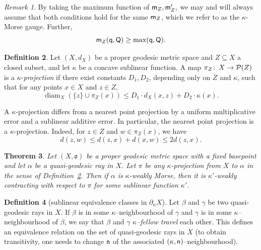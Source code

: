 \documentclass[12 pt]{amsart}
\newcommand{\gothic}{\mathfrak}
\newcommand{\go}{{\gothic o}}
\newtheorem{theorem}{Theorem}[section]
\theoremstyle{definition}
\newtheorem{definition}[theorem]{Definition}
\theoremstyle{remark}
\newtheorem{remark}[theorem]{Remark}
\newcommand{\pka}{\partial_{\kappa}}
\newcommand{\sQ}{{\sf Q}}
\newcommand{\mm}{{\sf m}}
\newcommand{\nn}{{\sf n}}
\newcommand{\qq}{{\sf q}}
\DeclareMathOperator{\diam}{diam}
\newcommand{\from}{\colon\thinspace}
\begin{document}
\begin{remark}
By taking the maximum function of $\mm_Z, \mm'_Z,$ we may and will always assume that both conditions hold for the same $\mm_Z$, which we refer to as the $\kappa$-Morse gauge. Further,
\begin{equation} 
\mm_Z(\qq, \sQ) \geq \max(\qq, \sQ). 
\end{equation} 
\end{remark}

\begin{definition} \label{weakprojection}
Let $(X, d_X)$ be a proper geodesic metric space and $Z \subseteq X$ a closed subset, and let 
$\kappa$ be a concave sublinear function. A map $\pi_{Z} \from X \to \mathcal{P}(Z)$ is a $\kappa$-\emph{projection}  if there exist constants $D_{1}, D_{2}$, depending only on $Z$ and $\kappa$, such that for any points $x \in X$ and $z \in Z$, 
\[
\diam_X(\{z \} \cup \pi_{Z}(x)) \leq D_{1} \cdot d_X(x, z) + D_{2} \cdot \kappa(x).
\]
\end{definition}

A $\kappa$-projection differs from a nearest point projection by a uniform multiplicative error and a sublinear additive error. In particular, the nearest point projection is a $\kappa$-projection. Indeed, for $z \in Z$ and $w \in \pi_Z(x)$, we have
\[
d(z, w) \leq d(z, x) + d(x, w) \leq 2d(z, x).
\]
\begin{theorem}\label{A-sublinearlyequivalence}
Let $(X, \go)$ be a proper geodesic metric space with a fixed basepoint and let $\alpha$ be a quasi-geodesic
ray in $X$. Let $\pi$ be any $\kappa$-projection from $X$ to $\alpha$ in the sense of Definition~\ref{weakprojection}.
Then if $\alpha$ is $\kappa$-weakly Morse, then it is $\kappa'$-weakly contracting with respect to $\pi$ for some sublinear function $\kappa'$.
\end{theorem}


\begin{definition}[sublinear equivalence classes in $\pka X$] \label{Def:Fellow-Travel}
Let $\beta$ and $\gamma$ be two quasi-geodesic rays in $X$. If $\beta$ is in some 
$\kappa$--neighbourhood of $\gamma$ and $\gamma$ is in some 
$\kappa$--neighbourhood of $\beta$, we say that $\beta$ and $\gamma$ 
\emph{$\kappa$--fellow travel} each other. This defines an equivalence
relation on the set of quasi-geodesic rays in $X$ (to obtain transitivity, one needs to change $\nn$ of the associated $(\kappa, \nn)$--neighbourhood). 
\end{definition}
\end{document}
